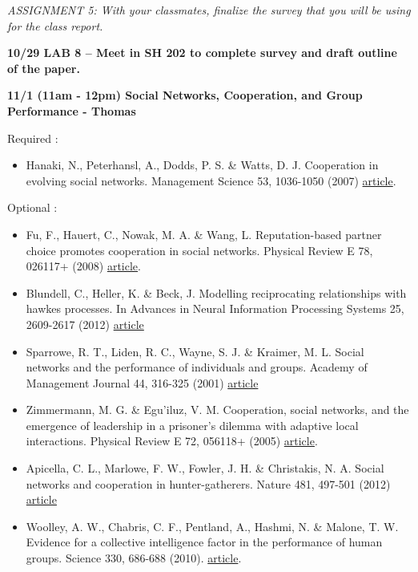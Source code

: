 \emph{ASSIGNMENT 5: With your classmates, finalize the survey that you
will be using for the class report.}

\textbf{10/29 LAB 8 -- Meet in SH 202 to complete survey and draft
outline of the paper.}

\textbf{11/1 (11am - 12pm) Social Networks, Cooperation, and Group
Performance - Thomas}

Required :

\begin{itemize}
\itemsep1pt\parskip0pt
\item
  Hanaki, N., Peterhansl, A., Dodds, P. S. \& Watts, D. J. Cooperation
  in evolving social networks. Management Science 53, 1036-1050 (2007)
  \href{http://mansci.journal.informs.org/content/53/7/1036.short}{article}.
\end{itemize}

Optional :

\begin{itemize}
\itemsep1pt\parskip0pt
\item
  Fu, F., Hauert, C., Nowak, M. A. \& Wang, L. Reputation-based partner
  choice promotes cooperation in social networks. Physical Review E 78,
  026117+ (2008)
  \href{http://dx.doi.org/10.1103/physreve.78.026117}{article}.
\item
  Blundell, C., Heller, K. \& Beck, J. Modelling reciprocating
  relationships with hawkes processes. In Advances in Neural Information
  Processing Systems 25, 2609-2617 (2012)
  \href{www.gatsby.ucl.ac.uk/~ucgtcbl/papers/BluHelBec2012.pdf‎}{article}
\item
  Sparrowe, R. T., Liden, R. C., Wayne, S. J. \& Kraimer, M. L. Social
  networks and the performance of individuals and groups. Academy of
  Management Journal 44, 316-325 (2001)
  \href{http://www.jstor.org/stable/3069458}{article}
\item
  Zimmermann, M. G. \& Egu'iluz, V. M. Cooperation, social networks, and
  the emergence of leadership in a prisoner's dilemma with adaptive
  local interactions. Physical Review E 72, 056118+ (2005)
  \href{http://dx.doi.org/10.1103/physreve.72.056118}{article}.
\item
  Apicella, C. L., Marlowe, F. W., Fowler, J. H. \& Christakis, N. A.
  Social networks and cooperation in hunter-gatherers. Nature 481,
  497-501 (2012) \href{http://dx.doi.org/10.1038/nature10736}{article}
\item
  Woolley, A. W., Chabris, C. F., Pentland, A., Hashmi, N. \& Malone, T.
  W. Evidence for a collective intelligence factor in the performance of
  human groups. Science 330, 686-688 (2010).
  \href{http://dx.doi.org/10.1126/science.1193147}{article}.
\end{itemize}

